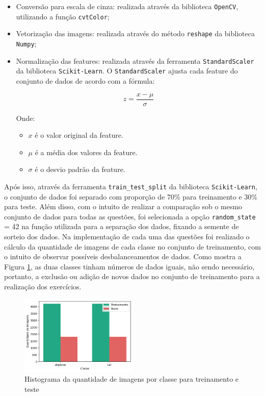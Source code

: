 \documentclass[]{abntex2}
\begin{document}
\begin{itemize}
    \item Conversão para escala de cinza: realizada através da biblioteca \texttt{OpenCV}, utilizando a função \texttt{cvtColor};
    \item Vetorização das imagens: realizada através do método \texttt{reshape} da biblioteca \texttt{Numpy};
    \item Normalização das features: realizada através da ferramenta \texttt{StandardScaler} da biblioteca \texttt{Scikit-Learn}. O \texttt{StandardScaler} ajusta cada feature do conjunto de dados de acordo com a fórmula:
    
    \[
    z = \frac{x - \mu}{\sigma}
    \]
    
    Onde:
    \begin{itemize}
        \item \( x \) é o valor original da feature.
        \item \( \mu \) é a média dos valores da feature.
        \item \( \sigma \) é o desvio padrão da feature.
    \end{itemize}
    
\end{itemize}

Após isso, através da ferramenta \texttt{train\_test\_split} da biblioteca \texttt{Scikit-Learn}, o conjunto de dados foi separado com proporção de 70\% para treinamento e 30\% para teste. Além disso, com o intuito de realizar a comparação sob o mesmo conjunto de dados para todas as questões, foi selecionada a opção \texttt{random\_state} = 42 na função utilizada para a separação dos dados, fixando a semente de sorteio dos dados. Na implementação de cada uma das questões foi realizado o cálculo da quantidade de imagens de cada classe no conjunto de treinamento, com o intuito de observar possíveis desbalanceamentos de dados. Como mostra a Figura \ref{fig:distri}, as duas classes tinham números de dados iguais, não sendo necessário, portanto, a exclusão ou adição de novos dados no conjunto de treinamento para a realização dos exercícios.

\begin{figure}[H]
    \centering 
    \includegraphics[width=0.5\textwidth]{imgs/introduction/distri.png}
    \caption{Histograma da quantidade de imagens por classe para treinamento e teste}
    \label{fig:distri} %
\end{figure}
\end{document}
